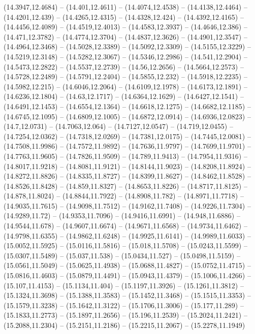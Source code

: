 {(14.3947,12.4684) -- (14.401,12.4611) -- (14.4074,12.4538) -- (14.4138,12.4464) -- (14.4201,12.439) -- (14.4265,12.4315) -- (14.4328,12.424) -- (14.4392,12.4165) -- (14.4456,12.4089) -- (14.4519,12.4013) -- (14.4583,12.3937) -- (14.4646,12.386) --
(14.471,12.3782) -- (14.4774,12.3704) -- (14.4837,12.3626) -- (14.4901,12.3547) -- (14.4964,12.3468) -- (14.5028,12.3389) -- (14.5092,12.3309) -- (14.5155,12.3229) -- (14.5219,12.3148) -- (14.5282,12.3067) -- (14.5346,12.2986) -- (14.541,12.2904) --
(14.5473,12.2822) -- (14.5537,12.2739) -- (14.56,12.2656) -- (14.5664,12.2573) -- (14.5728,12.2489) -- (14.5791,12.2404) -- (14.5855,12.232) -- (14.5918,12.2235) -- (14.5982,12.215) -- (14.6046,12.2064) -- (14.6109,12.1978) -- (14.6173,12.1891) --
(14.6236,12.1804) -- (14.63,12.1717) -- (14.6364,12.1629) -- (14.6427,12.1541) -- (14.6491,12.1453) -- (14.6554,12.1364) -- (14.6618,12.1275) -- (14.6682,12.1185) -- (14.6745,12.1095) -- (14.6809,12.1005) -- (14.6872,12.0914) -- (14.6936,12.0823) --
(14.7,12.0731) -- (14.7063,12.064) -- (14.7127,12.0547) -- (14.719,12.0455) -- (14.7254,12.0362) -- (14.7318,12.0269) -- (14.7381,12.0175) -- (14.7445,12.0081) -- (14.7508,11.9986) -- (14.7572,11.9892) -- (14.7636,11.9797) -- (14.7699,11.9701) --
(14.7763,11.9605) -- (14.7826,11.9509) -- (14.789,11.9413) -- (14.7954,11.9316) -- (14.8017,11.9218) -- (14.8081,11.9121) -- (14.8144,11.9023) -- (14.8208,11.8924) -- (14.8272,11.8826) -- (14.8335,11.8727) -- (14.8399,11.8627) -- (14.8462,11.8528)
-- (14.8526,11.8428) -- (14.859,11.8327) -- (14.8653,11.8226) -- (14.8717,11.8125) -- (14.878,11.8024) -- (14.8844,11.7922) -- (14.8908,11.782) -- (14.8971,11.7718) -- (14.9035,11.7615) -- (14.9098,11.7512) -- (14.9162,11.7408) -- (14.9226,11.7304)
-- (14.9289,11.72) -- (14.9353,11.7096) -- (14.9416,11.6991) -- (14.948,11.6886) -- (14.9544,11.678) -- (14.9607,11.6674) -- (14.9671,11.6568) -- (14.9734,11.6462) -- (14.9798,11.6355) -- (14.9862,11.6248) -- (14.9925,11.6141) -- (14.9989,11.6033)
-- (15.0052,11.5925) -- (15.0116,11.5816) -- (15.018,11.5708) -- (15.0243,11.5599) -- (15.0307,11.5489) -- (15.037,11.538) -- (15.0434,11.527) -- (15.0498,11.5159) -- (15.0561,11.5049) -- (15.0625,11.4938) -- (15.0688,11.4827) -- (15.0752,11.4715)
-- (15.0816,11.4603) -- (15.0879,11.4491) -- (15.0943,11.4379) -- (15.1006,11.4266) -- (15.107,11.4153) -- (15.1134,11.404) -- (15.1197,11.3926) -- (15.1261,11.3812) -- (15.1324,11.3698) -- (15.1388,11.3583) -- (15.1452,11.3468) -- (15.1515,11.3353)
-- (15.1579,11.3238) -- (15.1642,11.3122) -- (15.1706,11.3006) -- (15.177,11.289) -- (15.1833,11.2773) -- (15.1897,11.2656) -- (15.196,11.2539) -- (15.2024,11.2421) -- (15.2088,11.2304) -- (15.2151,11.2186) -- (15.2215,11.2067) -- (15.2278,11.1949)
}
